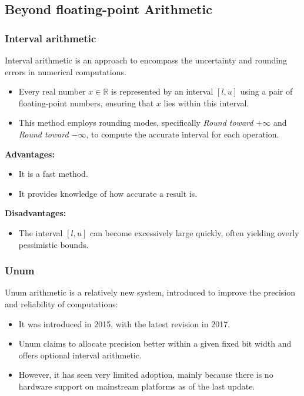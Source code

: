 \documentclass[12pt]{article}
\begin{document}
\subsection{Beyond floating-point Arithmetic} %

\subsubsection{Interval arithmetic} %
Interval arithmetic is an approach to encompass the uncertainty and rounding errors in numerical computations.

\begin{itemize}
    \item Every real number \( x \in \mathbb{R} \) is represented by an interval \([l, u]\) using a pair of floating-point numbers, ensuring that \( x \) lies within this interval.
    \item This method employs rounding modes, specifically \textit{Round toward \( +\infty \)} and \textit{Round toward \( -\infty \)}, to compute the accurate interval for each operation.
\end{itemize}

\textbf{Advantages:}
\begin{itemize}
    \item It is a fast method.
    \item It provides knowledge of how accurate a result is.
\end{itemize}

\textbf{Disadvantages:}
\begin{itemize}
    \item The interval \([l, u]\) can become excessively large quickly, often yielding overly pessimistic bounds.
\end{itemize}

\subsubsection{Unum}
Unum arithmetic is a relatively new system, introduced to improve the precision and reliability of computations:
\begin{itemize}
    \item It was introduced in 2015, with the latest revision in 2017.
    \item Unum claims to allocate precision better within a given fixed bit width and offers optional interval arithmetic.
    \item However, it has seen very limited adoption, mainly because there is no hardware support on mainstream platforms as of the last update.
\end{itemize}
\end{document}
